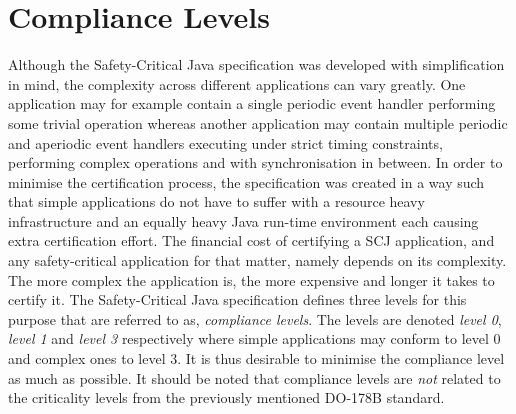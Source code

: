 \section{Compliance Levels}
\label{section:complianceLevels}
Although the Safety-Critical Java specification was developed with simplification in mind, the complexity across different applications can vary greatly. One application may for example contain a single periodic event handler performing some trivial operation whereas another application may contain multiple periodic and aperiodic event handlers executing under strict timing constraints, performing complex operations and with synchronisation in between. In order to minimise the certification process, the specification was created in a way such that simple applications do not have to suffer with a resource heavy infrastructure and an equally heavy Java run-time environment each causing extra certification effort. The financial cost of certifying a SCJ application, and any safety-critical application for that matter, namely depends on its complexity. The more complex the application is, the more expensive and longer it takes to certify it. The Safety-Critical Java specification defines three levels for this purpose that are referred to as, \textit{compliance levels}. The levels are denoted \textit{level 0}, \textit{level 1} and \textit{level 3} respectively where simple applications may conform to level 0 and complex ones to level 3. It is thus desirable to minimise the compliance level as much as possible. It should be noted that compliance levels are \textit{not} related to the criticality levels from the previously mentioned DO-178B standard.